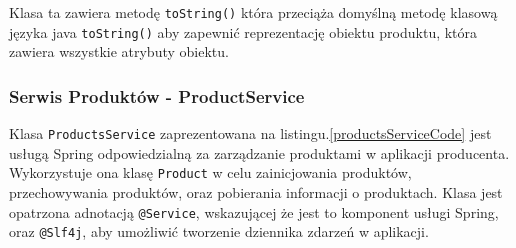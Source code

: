 Klasa ta zawiera metodę \verb|toString()| która przeciąża domyślną metodę klasową języka java \verb|toString()| aby zapewnić reprezentację obiektu produktu, która zawiera wszystkie atrybuty obiektu.

\subsubsection{Serwis Produktów - ProductService}

Klasa \verb|ProductsService| zaprezentowana na listingu.\ref{productsServiceCode} jest usługą Spring odpowiedzialną za zarządzanie produktami w aplikacji producenta. Wykorzystuje ona klasę \verb|Product| w celu zainicjowania produktów, przechowywania produktów, oraz pobierania informacji o produktach. Klasa jest opatrzona adnotacją \verb|@Service|, wskazującej że jest to komponent usługi Spring, oraz \verb|@Slf4j|, aby umożliwić tworzenie dziennika zdarzeń w aplikacji.

